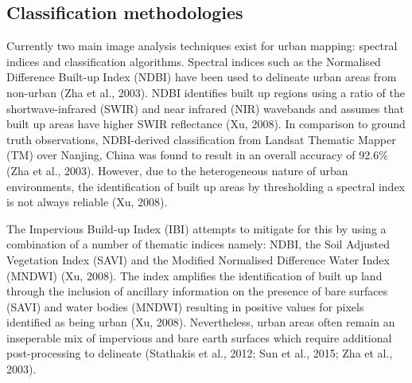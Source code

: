 \documentclass[]{book}
\begin{document}
\subsection{Classification
methodologies}\label{classification-methodologies}

Currently two main image analysis techniques exist for urban mapping:
spectral indices and classification algorithms. Spectral indices such as
the Normalised Difference Built-up Index (NDBI) have been used to
delineate urban areas from non-urban (Zha et al., 2003). NDBI identifies
built up regions using a ratio of the shortwave-infrared (SWIR) and near
infrared (NIR) wavebands and assumes that built up areas have higher
SWIR reflectance (Xu, 2008). In comparison to ground truth observations,
NDBI-derived classification from Landsat Thematic Mapper (TM) over
Nanjing, China was found to result in an overall accuracy of 92.6\% (Zha
et al., 2003). However, due to the heterogeneous nature of urban
environments, the identification of built up areas by thresholding a
spectral index is not always reliable (Xu, 2008).

The Impervious Build-up Index (IBI) attempts to mitigate for this by
using a combination of a number of thematic indices namely: NDBI, the
Soil Adjusted Vegetation Index (SAVI) and the Modified Normalised
Difference Water Index (MNDWI) (Xu, 2008). The index amplifies the
identification of built up land through the inclusion of ancillary
information on the presence of bare surfaces (SAVI) and water bodies
(MNDWI) resulting in positive values for pixels identified as being
urban (Xu, 2008). Nevertheless, urban areas often remain an inseperable
mix of impervious and bare earth surfaces which require additional
post-processing to delineate (Stathakis et al., 2012; Sun et al., 2015;
Zha et al., 2003).
\end{document}
